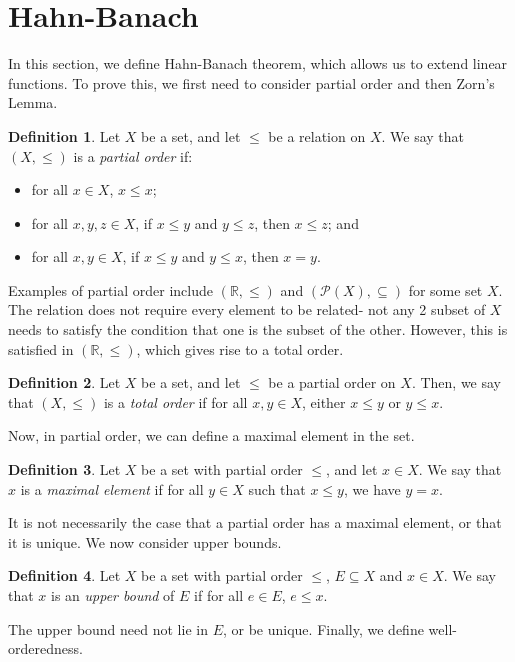 \documentclass[a4paper, openany]{memoir}
\theoremstyle{definition}
\newtheorem{definition}{Definition}[section]
\theoremstyle{plain}
\begin{document}
    \section{Hahn-Banach}
    In this section, we define Hahn-Banach theorem, which allows us to extend linear functions. To prove this, we first need to consider partial order and then Zorn's Lemma.
    \begin{definition}
        Let $X$ be a set, and let $\leq$ be a relation on $X$. We say that $(X, \leq)$ is a \emph{partial order} if:
        \begin{itemize}
            \item for all $x \in X$, $x \leq x$;
            \item for all $x, y, z \in X$, if $x \leq y$ and $y \leq z$, then $x \leq z$; and
            \item for all $x, y \in X$, if $x \leq y$ and $y \leq x$, then $x = y$.
        \end{itemize}
    \end{definition}
    \noindent Examples of partial order include $(\mathbb{R}, \leq)$ and $(\mathcal{P}(X), \subseteq)$ for some set $X$. The relation does not require every element to be related- not any 2 subset of $X$ needs to satisfy the condition that one is the subset of the other. However, this is satisfied in $(\mathbb{R}, \leq)$, which gives rise to a total order.
    \begin{definition}
        Let $X$ be a set, and let $\leq$ be a partial order on $X$. Then, we say that $(X, \leq)$ is a \emph{total order} if for all $x, y \in X$, either $x \leq y$ or $y \leq x$.
    \end{definition}
    \noindent Now, in partial order, we can define a maximal element in the set.
    \begin{definition}
        Let $X$ be a set with partial order $\leq$, and let $x \in X$. We say that $x$ is a \emph{maximal element} if for all $y \in X$ such that $x \leq y$, we have $y = x$.
    \end{definition}
    \noindent It is not necessarily the case that a partial order has a maximal element, or that it is unique. We now consider upper bounds.
    \begin{definition}
        Let $X$ be a set with partial order $\leq$, $E \subseteq X$ and $x \in X$. We say that $x$ is an \emph{upper bound} of $E$ if for all $e \in E$, $e \leq x$.
    \end{definition}
    \noindent The upper bound need not lie in $E$, or be unique. Finally, we define well-orderedness.
\end{document}
